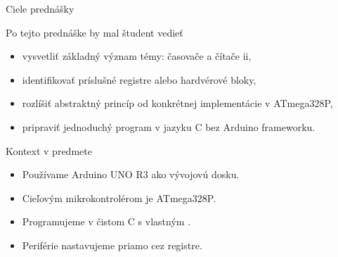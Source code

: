 
\begin{frame}{Ciele prednášky}
\begin{tukebox}{Po tejto prednáške by mal študent vedieť}
\begin{itemize}
    \item vysvetliť základný význam témy: časovače a čítače ii,
    \item identifikovať príslušné registre alebo hardvérové bloky,
    \item rozlíšiť abstraktný princíp od konkrétnej implementácie v ATmega328P,
    \item pripraviť jednoduchý program v jazyku C bez Arduino frameworku.
\end{itemize}
\end{tukebox}
\end{frame}

\begin{frame}{Kontext v predmete}
\begin{itemize}
    \item Používame Arduino UNO R3 ako vývojovú dosku.
    \item Cieľovým mikrokontrolérom je ATmega328P.
    \item Programujeme v čistom C s vlastným .
    \item Periférie nastavujeme priamo cez registre.
\end{itemize}
\end{frame}
